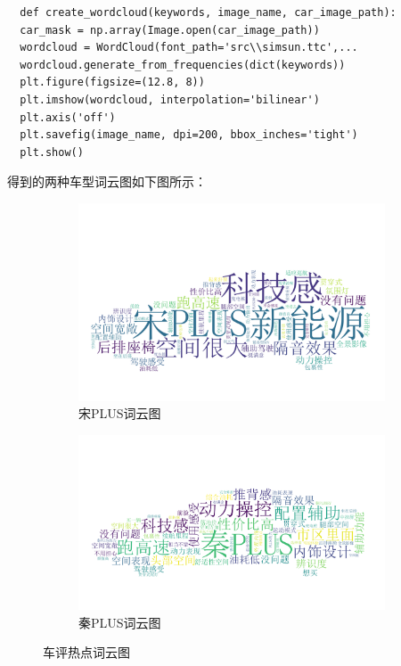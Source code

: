 \documentclass[UTF8,a4paper,15pt,titlepage,oneside]{ctexbook}
\begin{document}
\begin{mdframed}[backgroundcolor=darkgray, linecolor=lightgray, linewidth=1pt, innermargin=0.5cm, outermargin=0.5cm, skipbelow=0.1cm]
  \color{white}
  \begin{verbatim}
  def create_wordcloud(keywords, image_name, car_image_path):
  car_mask = np.array(Image.open(car_image_path))
  wordcloud = WordCloud(font_path='src\\simsun.ttc',...
  wordcloud.generate_from_frequencies(dict(keywords))
  plt.figure(figsize=(12.8, 8))
  plt.imshow(wordcloud, interpolation='bilinear')
  plt.axis('off')
  plt.savefig(image_name, dpi=200, bbox_inches='tight')
  plt.show()
\end{verbatim}  
\end{mdframed}

得到的两种车型词云图如下图所示：


\begin{figure}[htbp]
  \centering
  
  \begin{subfigure}{0.45\textwidth}
    \includegraphics[width=\linewidth]{pictures/51.png}
    \caption{宋PLUS词云图}
  \end{subfigure}
   \hspace{0.3em}%
  \begin{subfigure}{0.5\textwidth}
    \includegraphics[width=\linewidth]{pictures/52.png}
    \caption{秦PLUS词云图}
  \end{subfigure}
  
  \caption{车评热点词云图}
  \end{figure}
\end{document}
